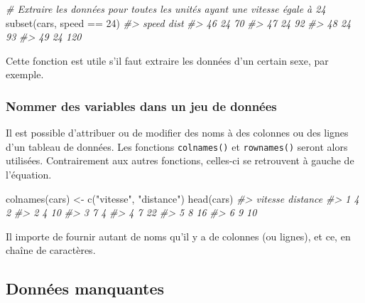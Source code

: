 \documentclass[
]{book}
\newenvironment{Shaded}{}{}
\newcommand{\CommentTok}[1]{\textit{#1}}
\newcommand{\DecValTok}[1]{#1}
\newcommand{\FunctionTok}[1]{#1}
\newcommand{\NormalTok}[1]{#1}
\newcommand{\OtherTok}[1]{#1}
\newcommand{\SpecialCharTok}[1]{#1}
\newcommand{\StringTok}[1]{#1}
\begin{document}
\begin{Shaded}
\begin{Highlighting}[]
\CommentTok{\# Extraire les données pour toutes les unités ayant une vitesse égale à 24}
\FunctionTok{subset}\NormalTok{(cars, speed }\SpecialCharTok{==} \DecValTok{24}\NormalTok{)}
\CommentTok{\#\textgreater{}    speed dist}
\CommentTok{\#\textgreater{} 46    24   70}
\CommentTok{\#\textgreater{} 47    24   92}
\CommentTok{\#\textgreater{} 48    24   93}
\CommentTok{\#\textgreater{} 49    24  120}
\end{Highlighting}
\end{Shaded}

Cette fonction est utile s'il faut extraire les données d'un certain sexe, par exemple.

\hypertarget{nommer-des-variables-dans-un-jeu-de-donnuxe9es}{%
\subsubsection{Nommer des variables dans un jeu de données}\label{nommer-des-variables-dans-un-jeu-de-donnuxe9es}}

Il est possible d'attribuer ou de modifier des noms à des colonnes ou des lignes d'un tableau de données. Les fonctions \texttt{colnames()} et \texttt{rownames()} seront alors utilisées. Contrairement aux autres fonctions, celles-ci se retrouvent à gauche de l'équation.

\begin{Shaded}
\begin{Highlighting}[]
\FunctionTok{colnames}\NormalTok{(cars) }\OtherTok{\textless{}{-}}  \FunctionTok{c}\NormalTok{(}\StringTok{"vitesse"}\NormalTok{, }\StringTok{"distance"}\NormalTok{)}
\FunctionTok{head}\NormalTok{(cars)}
\CommentTok{\#\textgreater{}   vitesse distance}
\CommentTok{\#\textgreater{} 1       4        2}
\CommentTok{\#\textgreater{} 2       4       10}
\CommentTok{\#\textgreater{} 3       7        4}
\CommentTok{\#\textgreater{} 4       7       22}
\CommentTok{\#\textgreater{} 5       8       16}
\CommentTok{\#\textgreater{} 6       9       10}
\end{Highlighting}
\end{Shaded}

Il importe de fournir autant de noms qu'il y a de colonnes (ou lignes), et ce, en chaîne de caractères.

\hypertarget{donnuxe9es-manquantes}{%
\subsection{Données manquantes}\label{donnuxe9es-manquantes}}
\end{document}
